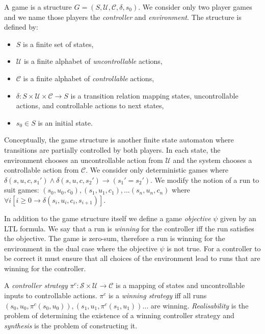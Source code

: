 A game is a structure $G = (S, \mathcal{U}, \mathcal{C}, \delta, s_0)$. We consider only two player games and we name those players the \emph{controller} and \emph{environment}. The structure is defined by:

\begin{itemize}
    \item $S$ is a finite set of states,
    \item $\mathcal{U}$ is a finite alphabet of \emph{uncontrollable} actions,
    \item $\mathcal{C}$ is a finite alphabet of \emph{controllable} actions,
    \item $\delta : S \times \mathcal{U} \times \mathcal{C} \to S$ is a transition relation mapping states, uncontrollable actions, and controllable actions to next states,
    \item $s_0 \in S$ is an initial state.
\end{itemize}

Conceptually, the game structure is another finite state automaton where transitions are partially controlled by both players. In each state, the environment chooses an uncontrollable action from $\mathcal{U}$ and the system chooses a controllable action from $\mathcal{C}$. We consider only deterministic games where $\delta(s, u, c, s_1') \land \delta(s, u, c, s_2') \to (s_1' = s_2')$.  We modify the notion of a run to suit games: $(s_0, u_0, c_0), (s_1, u_1, c_1), ... (s_n, u_n, c_n)$ where $\forall i [i \geq 0 \to \delta(s_i, u_i, c_i, s_{i+1})]$. 

In addition to the game structure itself we define a game \emph{objective} $\psi$ given by an LTL formula. We say that a run is \emph{winning} for the controller iff the run satisfies the objective. The game is zero-sum, therefore a run is winning for the environment in the dual case where the objective $\psi$ is not true. For a controller to be correct it must ensure that all choices of the environment lead to runs that are winning for the controller. 



A \emph{controller strategy} $\pi^c : \mathcal{S} \times \mathcal{U} \to \mathcal{C}$ is a mapping of states and uncontrollable inputs to controllable actions. $\pi^c$ is a \emph{winning strategy} iff all runs $(s_0, u_0, \pi^c(s_0, u_0)), (s_1, u_1, \pi^c(s_1, u_1)) \dots$ are winning. \emph{Realisability} is the problem of determining the existence of a winning controller strategy and \emph{synthesis} is the problem of constructing it.

